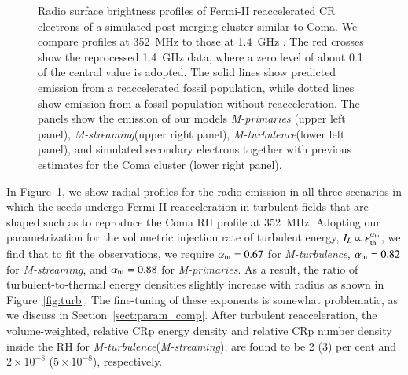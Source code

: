 \documentclass[fleqn,usenatbib,useAMS]{mnras}
\newcommand{\Mstream}{{\it M-streaming}\xspace}
\newcommand{\Mflatturb}{{\it M-turbulence}\xspace}
\newcommand{\Mprimary}{{\it M-primaries}\xspace}
\newcommand{\eps}{\varepsilon}
\begin{document}
\begin{figure}
\begin{minipage}{1\columnwidth}
\begin{center}
   \end{center}
\end{minipage}
\caption{Radio surface brightness profiles of Fermi-II reaccelerated CR
  electrons of a simulated post-merging cluster similar to Coma. We compare
  profiles at 352~MHz \citep[blue lines and crosses,][]{brown11} to those at
  1.4~GHz \citep[green lines and crosses,][]{deiss97}. The red crosses show the
  reprocessed 1.4~GHz data, where a zero level of about 0.1 of the central value
  is adopted. The solid lines show predicted emission from a reaccelerated
  fossil population, while dotted lines show emission from a fossil population
  without reacceleration. The panels show the emission of our models \Mprimary
  (upper left panel), \Mstream (upper right panel), \Mflatturb (lower left
  panel), and simulated secondary electrons together with previous estimates
  \citep{brunetti12} for the Coma cluster (lower right panel).}
  \label{fig:sync_profile}
\end{figure}

In Figure~\ref{fig:sync_profile}, we show radial profiles for the radio
emission in all three scenarios in which the seeds undergo Fermi-II
reacceleration in turbulent fields that are shaped such as to
reproduce the Coma RH profile at 352~MHz.  Adopting our
parametrization for the volumetric injection rate of turbulent energy,
$I_L\propto \eps_\rmn{th}^{\alpha_\rmn{tu}}$, we find that to fit the observations, we require
$\alpha_{\mathrm{tu}}= 0.67$ for \Mflatturb, $\alpha_{\mathrm{tu}}= 0.82$ for
\Mstream, and $\alpha_{\mathrm{tu}}= 0.88$ for \Mprimary. As a result, the
ratio of turbulent-to-thermal energy densities slightly increase with
radius as shown in Figure~\ref{fig:turb}.  The fine-tuning of these exponents is somewhat problematic, as we discuss in Section~\ref{sect:param_comp}. After turbulent
reacceleration, the volume-weighted, relative CRp energy density and
relative CRp number density inside the RH for \Mflatturb (\Mstream),
are found to be 2 (3) per cent and $2\times10^{-8}$ ($5\times10^{-8}$),
respectively.
\end{document}
